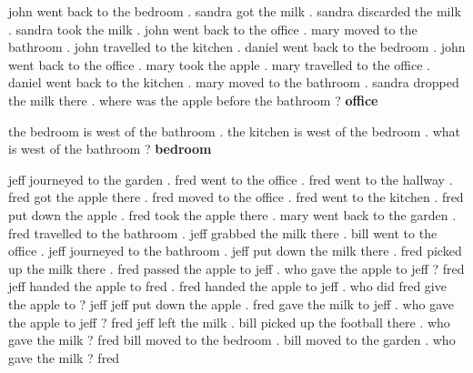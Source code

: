 \begin{tcbraster}[raster columns=2, size=minimal, raster valign=top]
\begin{tcolorbox}[mybox, title=Task 2:Name, height fill]
 
    \end{tcolorbox}     
    \begin{tcolorbox}[mybox, title=Task 3:Name, height fill] 
    \tiny
     john went back to the bedroom . sandra got the milk . sandra discarded the milk . sandra took the milk . john went back to the office . mary moved to the bathroom . john travelled to the kitchen . daniel went back to the bedroom . john went back to the office . mary took the apple . mary travelled to the office . daniel went back to the kitchen . mary moved to the bathroom . sandra dropped the milk there . where was the apple before the bathroom ? \textbf{office} 
    \end{tcolorbox}  
    \begin{tcolorbox}[mybox, title=Task 4:Name, height fill] 
    \tiny
    the bedroom is west of the bathroom . the kitchen is west of the bedroom . what is west of the bathroom ? \textbf{bedroom}
    \end{tcolorbox}    


    \begin{tcolorbox}[mybox, title=Task 5:Name, height fill] 
    \tiny
    jeff journeyed to the garden . fred went to the office . fred went to the hallway . fred got the apple there . fred moved to the office . fred went to the kitchen . fred put down the apple . fred took the apple there . mary went back to the garden . fred travelled to the bathroom . jeff grabbed the milk there . bill went to the office . jeff journeyed to the bathroom . jeff put down the milk there . fred picked up the milk there . fred passed the apple to jeff . who gave the apple to jeff ? fred jeff handed the apple to fred . fred handed the apple to jeff . who did fred give the apple to ? jeff jeff put down the apple . fred gave the milk to jeff . who gave the apple to jeff ? fred jeff left the milk . bill picked up the football there . who gave the milk ? fred bill moved to the bedroom . bill moved to the garden . who gave the milk ? fred
    \end{tcolorbox}  



\end{tcbraster}
